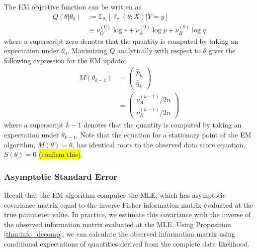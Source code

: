 \documentclass[11pt, oneside]{article}   	%
\newcommand{\bE}{\mathbb{E}}
\begin{document}
\begin{appendices}
    
    The EM objective function can be written as
    \begin{align}
		Q(\theta | \theta_0) &:= \bE_{\theta_0} [\ell_c (\theta; X) | Y=y]\\
		&\equiv \nu_O^{(0)} \log r + \nu_A^{(0)} \log p + \nu_B^{(0)} \log q
	\end{align}
    where a superscript zero denotes that the quantity is computed by taking an expectation under $\theta_0$. Maximizing $Q$ analytically with respect to $\theta$ gives the following expression for the EM update:
    \begin{align}
        M(\theta_{k-1}) &= \begin{pmatrix}
            \hat{p}_k\\ \hat{q}_k
        \end{pmatrix}\\
        &= \begin{pmatrix}
            \nu_A^{(k-1)} / 2n\\
            \nu_B^{(k-1)} / 2n
        \end{pmatrix}
    \end{align}
    where a superscript $k-1$ denotes that the quantity is computed by taking an expectation under $\theta_{k-1}$. Note that the equation for a stationary point of the EM algorithm, $M(\theta) = \theta$, has identical roots to the observed data score equation, $S(\theta) = 0$ \hl{(confirm this)}.

    \subsubsection{Asymptotic Standard Error}

    Recall that the EM algorithm computes the MLE, which has asymptotic covariance matrix equal to the inverse Fisher information matrix evaluated at the true parameter value. In practice, we estimate this covariance with the inverse of the observed information matrix evaluated at the MLE. Using Proposition \ref{thm:info_decomp}, we can calculate the observed information matrix using conditional expectations of quantities derived from the complete data likelihood. 
    

\end{appendices}
\end{document}
